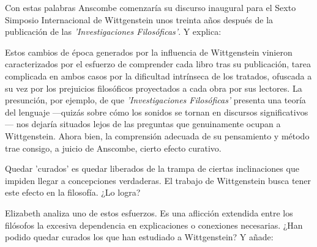  \autocite[p.~181]{anscombe2011plato:twocuts} 
 Con estas palabras Anscombe comenzaría su discurso inaugural para el Sexto
 Simposio Internacional de Wittgenstein unos treinta años después de la
 publicación de las \emph{'Investigaciones Filosóficas'}. Y explica:
 \autocite[p.~181]{anscombe2011plato:twocuts}

 Estos cambios de época generados por la influencia de Wittgenstein vinieron
 caracterizados por el esfuerzo de comprender cada libro tras su publicación,
 tarea complicada en ambos casos por la dificultad intrínseca de los tratados,
 ofuscada a su vez por los prejuicios filosóficos proyectados a cada obra por sus
 lectores. La presunción, por ejemplo, de que \emph{'Investigaciones
   Filosóficas'} presenta una teoría del lenguaje ---quizás sobre cómo los
 sonidos se tornan en discursos significativos--- nos dejaría situados lejos de
 las preguntas que genuinamente ocupan a
 Wittgenstein.\autocite[cf.~][p.~183]{anscombe2011plato:twocuts} Ahora bien, la comprensión
 adecuada de su pensamiento y método trae consigo, a juicio de Anscombe, cierto
 efecto curativo.

Quedar 'curados' es quedar liberados de la trampa de ciertas inclinaciones que
impiden llegar a concepciones verdaderas. El trabajo de Wittgenstein busca tener
este efecto en la filosofía. ¿Lo logra?

Elizabeth analiza uno de estos esfuerzos. Es una aflicción extendida entre los
filósofos la excesiva dependencia en explicaciones o conexiones necesarias. ¿Han
podido quedar curados los que han estudiado a Wittgenstein? Y añade:

